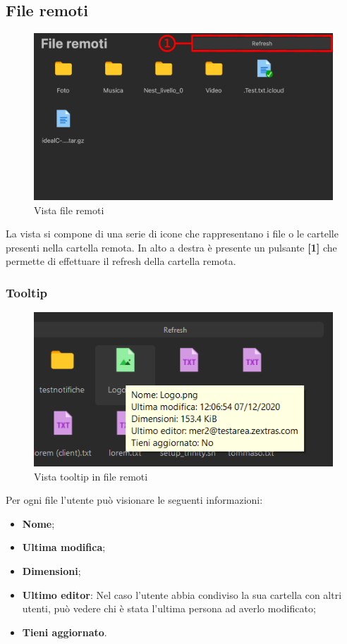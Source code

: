 \subsection{File remoti}
\label{sec:fileRemoti}
\begin{figure}[H]
    \centering
    \includegraphics[scale = 0.8]{components/img/fileRem.png}
    \caption{Vista file remoti}
    \label{fig:fileRem}
\end{figure}
La vista si compone di una serie di icone che rappresentano i file o le cartelle presenti nella cartella remota. In alto a destra è presente un pulsante \textbf{[1]} che permette di effettuare il refresh della cartella remota.

\subsubsection{Tooltip}
\label{sec:fileRemotiTooltip}
\begin{figure}[H]
    \centering
    \includegraphics[scale = 0.8]{components/img/fileRem_tooltip.png}
    \caption{Vista tooltip in file remoti}
    \label{fig:fileRemotiTooltip}
\end{figure}
Per ogni file l'utente può visionare le seguenti informazioni:
\begin{itemize}
    \item \textbf{Nome};
    \item \textbf{Ultima modifica};
    \item \textbf{Dimensioni};
    \item \textbf{Ultimo editor}: Nel caso l'utente abbia condiviso la sua cartella con altri utenti, può vedere chi è stata l'ultima persona ad averlo modificato;
    \item \textbf{Tieni aggiornato}.
\end{itemize}

